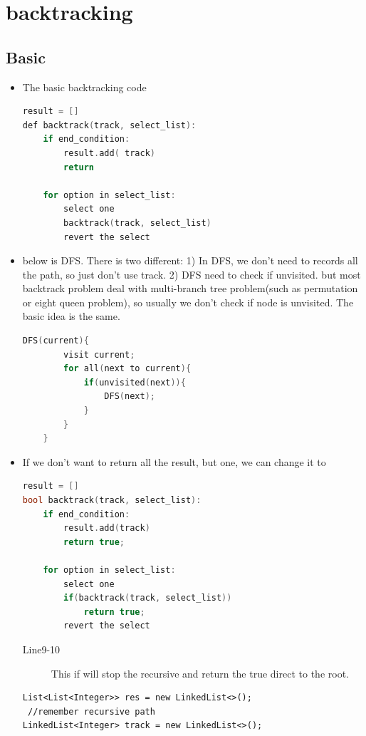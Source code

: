 \documentclass[a4paper,11pt,twoside]{book}
\begin{document}
\fi

\section{backtracking}
\subsection{Basic}
\begin{itemize}
	
	\item The basic backtracking code
\begin{lstlisting}[frame=single, language=c++]
result = []
def backtrack(track, select_list):
	if end_condition:
		result.add( track)
		return

	for option in select_list:
		select one
		backtrack(track, select_list)
		revert the select	
\end{lstlisting}

\item below is DFS. There is two different: 1) In DFS, we don't need to records all the path, so just don't use track. 2) DFS need to check if unvisited. but most backtrack problem deal with multi-branch tree problem(such as permutation or eight queen problem), so usually we don't check if node is unvisited. The basic idea is the same. 
\begin{lstlisting}[frame=single, language=c++]
	DFS(current){
		visit current;
		for all(next to current){
			if(unvisited(next)){
				DFS(next);
			}
		}
	}
\end{lstlisting} 


	\item If we don't want to return all the result, but one, we can change it to 
\begin{lstlisting}[frame=single, language=c++]
result = []
bool backtrack(track, select_list):
	if end_condition:
		result.add(track)
		return true;
	
	for option in select_list:
		select one
		if(backtrack(track, select_list))
			return true;
		revert the select	
\end{lstlisting}
\begin{description}
	\item[Line9-10] This if will stop the recursive and return the true direct to the root.
\end{description}


\begin{lstlisting}
List<List<Integer>> res = new LinkedList<>();
 //remember recursive path
LinkedList<Integer> track = new LinkedList<>();


\end{lstlisting}
\end{itemize}
\end{document}

